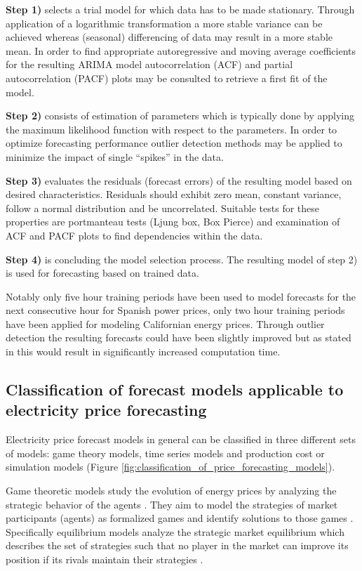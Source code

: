 \textbf{Step 1)} selects a trial model for which data has to be made stationary. Through application of a logarithmic transformation a more stable variance can be achieved whereas (seasonal) differencing of data may result in a more stable mean. In order to find appropriate autoregressive and moving average coefficients for the resulting ARIMA model autocorrelation (ACF) and partial autocorrelation (PACF) plots may be consulted to retrieve a first fit of the model. 

\textbf{Step 2)} consists of estimation of parameters which is typically done by applying the maximum likelihood function with respect to the parameters. In order to optimize forecasting performance outlier detection methods may be applied to minimize the impact of single "`spikes"' in the data. 

\textbf{Step 3)} evaluates the residuals (forecast errors) of the resulting model based on desired characteristics. Residuals should exhibit zero mean, constant variance, follow a normal distribution and be uncorrelated. Suitable tests for these properties are portmanteau tests (Ljung box, Box Pierce) and examination of ACF and PACF plots to find dependencies within the data. 

\textbf{Step 4)} is concluding the model selection process. The resulting model of step 2) is used for forecasting based on trained data. 

Notably only five hour training periods have been used to model forecasts for the next consecutive hour for Spanish power prices, only two hour training periods have been applied for modeling Californian energy prices. 
Through outlier detection the resulting forecasts could have been slightly improved but as stated in \cite{contreras2003arima} this would result in significantly increased computation time. 


\subsection{Classification of forecast models applicable to electricity price forecasting}

Electricity price forecast models in general can be classified in three different sets of models: game theory models, time series models and production cost or simulation models \cite{gonzalez2005modeling, aggarwal2009electricity} (Figure \ref{fig:classification_of_price_forecasting_models}).  

Game theoretic models study the evolution of energy prices by analyzing the strategic behavior of the agents \cite{gonzalez2005modeling}. They aim to model the strategies of market participants (agents) as formalized games and identify solutions to those games \cite{aggarwal2009electricity}. Specifically equilibrium models analyze the strategic market equilibrium which describes the set of strategies such that no player in the market can improve its position if its rivals maintain their strategies \cite{gonzalez2005modeling}. 

